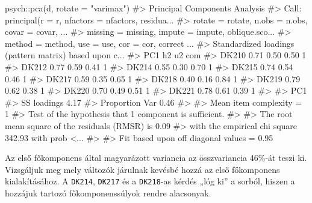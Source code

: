 \documentclass[
  letterpaper,
]{krantz}
\makeatletter
\newenvironment{Shaded}{\begin{snugshade}}{\end{snugshade}}
\newcommand{\AttributeTok}[1]{\textcolor[rgb]{0.40,0.45,0.13}{#1}}
\newcommand{\CommentTok}[1]{\textcolor[rgb]{0.37,0.37,0.37}{#1}}
\newcommand{\FunctionTok}[1]{\textcolor[rgb]{0.28,0.35,0.67}{#1}}
\newcommand{\NormalTok}[1]{\textcolor[rgb]{0.00,0.23,0.31}{#1}}
\newcommand{\SpecialCharTok}[1]{\textcolor[rgb]{0.37,0.37,0.37}{#1}}
\newcommand{\StringTok}[1]{\textcolor[rgb]{0.13,0.47,0.30}{#1}}
\newenvironment{kframe}{%
\medskip{}
\setlength{\fboxsep}{.8em}
 \def\at@end@of@kframe{}%
 \ifinner\ifhmode%
  \def\at@end@of@kframe{\end{minipage}}%
  \begin{minipage}{\columnwidth}%
 \fi\fi%
 \def\FrameCommand##1{\hskip\@totalleftmargin \hskip-\fboxsep
 \colorbox{shadecolor}{##1}\hskip-\fboxsep
     \hskip-\linewidth \hskip-\@totalleftmargin \hskip\columnwidth}%
 \MakeFramed {\advance\hsize-\width
   \@totalleftmargin\z@ \linewidth\hsize
   \@setminipage}}%
 {\par\unskip\endMakeFramed%
 \at@end@of@kframe}
\renewenvironment{Shaded}{\begin{kframe}}{\end{kframe}}
\makeatother
\begin{document}
\begin{Shaded}
\begin{Highlighting}[]
\NormalTok{psych}\SpecialCharTok{::}\FunctionTok{pca}\NormalTok{(d, }\AttributeTok{rotate =} \StringTok{"varimax"}\NormalTok{)}
\CommentTok{\#\textgreater{} Principal Components Analysis}
\CommentTok{\#\textgreater{} Call: principal(r = r, nfactors = nfactors, residua...}
\CommentTok{\#\textgreater{}     rotate = rotate, n.obs = n.obs, covar = covar, ...}
\CommentTok{\#\textgreater{}     missing = missing, impute = impute, oblique.sco...}
\CommentTok{\#\textgreater{}     method = method, use = use, cor = cor, correct ...}
\CommentTok{\#\textgreater{} Standardized loadings (pattern matrix) based upon c...}
\CommentTok{\#\textgreater{}        PC1   h2   u2 com}
\CommentTok{\#\textgreater{} DK210 0.71 0.50 0.50   1}
\CommentTok{\#\textgreater{} DK212 0.77 0.59 0.41   1}
\CommentTok{\#\textgreater{} DK214 0.55 0.30 0.70   1}
\CommentTok{\#\textgreater{} DK215 0.74 0.54 0.46   1}
\CommentTok{\#\textgreater{} DK217 0.59 0.35 0.65   1}
\CommentTok{\#\textgreater{} DK218 0.40 0.16 0.84   1}
\CommentTok{\#\textgreater{} DK219 0.79 0.62 0.38   1}
\CommentTok{\#\textgreater{} DK220 0.70 0.49 0.51   1}
\CommentTok{\#\textgreater{} DK221 0.78 0.61 0.39   1}
\CommentTok{\#\textgreater{} }
\CommentTok{\#\textgreater{}                 PC1}
\CommentTok{\#\textgreater{} SS loadings    4.17}
\CommentTok{\#\textgreater{} Proportion Var 0.46}
\CommentTok{\#\textgreater{} }
\CommentTok{\#\textgreater{} Mean item complexity =  1}
\CommentTok{\#\textgreater{} Test of the hypothesis that 1 component is sufficient.}
\CommentTok{\#\textgreater{} }
\CommentTok{\#\textgreater{} The root mean square of the residuals (RMSR) is  0.09 }
\CommentTok{\#\textgreater{}  with the empirical chi square  342.93  with prob \textless{}...}
\CommentTok{\#\textgreater{} }
\CommentTok{\#\textgreater{} Fit based upon off diagonal values = 0.95}
\end{Highlighting}
\end{Shaded}

Az első főkomponens által magyarázott variancia az összvariancia 46\%-át
teszi ki. Vizsgáljuk meg mely változók járulnak kevésbé hozzá az első
főkomponens kialakításához. A \texttt{DK214}, \texttt{DK217} és a
\texttt{DK218}-as kérdés „lóg ki'' a sorból, hiszen a hozzájuk tartozó
főkomponenssúlyok rendre alacsonyak.
\end{document}
